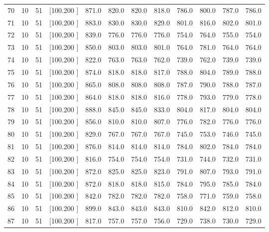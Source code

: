 \documentclass[12pt,a4paper]{article}
\begin{document}
\begin{center}
{\begin{tabular}{r r r r r r r r r r r r}
  70& 10& 51&[100.200   ]&   871.0&   820.0&   820.0&   818.0&   786.0&   800.0&   787.0&   786.0\\[-0.02in]
  71& 10& 51&[100.200   ]&   883.0&   830.0&   830.0&   829.0&   801.0&   816.0&   802.0&   801.0\\[-0.02in]
  72& 10& 51&[100.200   ]&   839.0&   776.0&   776.0&   776.0&   754.0&   764.0&   755.0&   754.0\\[-0.02in]
  73& 10& 51&[100.200   ]&   850.0&   803.0&   803.0&   801.0&   764.0&   781.0&   764.0&   764.0\\[-0.02in]
  74& 10& 51&[100.200   ]&   822.0&   763.0&   763.0&   762.0&   739.0&   762.0&   739.0&   739.0\\[-0.02in]
  75& 10& 51&[100.200   ]&   874.0&   818.0&   818.0&   817.0&   788.0&   804.0&   789.0&   788.0\\[-0.02in]
  76& 10& 51&[100.200   ]&   865.0&   808.0&   808.0&   808.0&   787.0&   790.0&   788.0&   787.0\\[-0.02in]
  77& 10& 51&[100.200   ]&   864.0&   818.0&   818.0&   816.0&   778.0&   793.0&   779.0&   778.0\\[-0.02in]
  78& 10& 51&[100.200   ]&   888.0&   845.0&   845.0&   833.0&   804.0&   817.0&   804.0&   804.0\\[-0.02in]
  79& 10& 51&[100.200   ]&   856.0&   810.0&   810.0&   807.0&   776.0&   782.0&   776.0&   776.0\\[-0.02in]
  80& 10& 51&[100.200   ]&   829.0&   767.0&   767.0&   767.0&   745.0&   753.0&   746.0&   745.0\\[-0.02in]
  81& 10& 51&[100.200   ]&   876.0&   814.0&   814.0&   814.0&   784.0&   802.0&   784.0&   784.0\\[-0.02in]
  82& 10& 51&[100.200   ]&   816.0&   754.0&   754.0&   754.0&   731.0&   744.0&   732.0&   731.0\\[-0.02in]
  83& 10& 51&[100.200   ]&   872.0&   825.0&   825.0&   823.0&   791.0&   807.0&   793.0&   791.0\\[-0.02in]
  84& 10& 51&[100.200   ]&   872.0&   818.0&   818.0&   815.0&   784.0&   795.0&   785.0&   784.0\\[-0.02in]
  85& 10& 51&[100.200   ]&   842.0&   782.0&   782.0&   782.0&   758.0&   771.0&   759.0&   758.0\\[-0.02in]
  86& 10& 51&[100.200   ]&   899.0&   843.0&   843.0&   843.0&   810.0&   842.0&   812.0&   810.0\\[-0.02in]
  87& 10& 51&[100.200   ]&   817.0&   757.0&   757.0&   756.0&   729.0&   738.0&   730.0&   729.0\\[-0.02in]

\end{tabular}}
\end{center}
\end{document}

